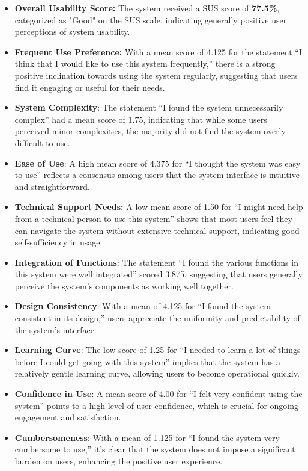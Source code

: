 \documentclass[conference]{IEEEtran}
\begin{document}
    \begin{itemize}
        \item \textbf{Overall Usability Score:} The system received a SUS score of \textbf{77.5\%}, categorized as "Good" on the SUS scale, indicating generally positive user perceptions of system usability.
        \item \textbf{Frequent Use Preference:} With a mean score of 4.125 for the statement ``I think that I would like to use this system frequently,'' there is a strong positive inclination towards using the system regularly, suggesting that users find it engaging or useful for their needs.
        \item \textbf{System Complexity}: The statement ``I found the system unnecessarily complex'' had a mean score of 1.75, indicating that while some users perceived minor complexities, the majority did not find the system overly difficult to use.
        \item \textbf{Ease of Use}: A high mean score of 4.375 for ``I thought the system was easy to use'' reflects a consensus among users that the system interface is intuitive and straightforward.
        \item \textbf{Technical Support Needs:} A low mean score of 1.50 for ``I might need help from a technical person to use this system'' shows that most users feel they can navigate the system without extensive technical support, indicating good self-sufficiency in usage.
        \item \textbf{Integration of Functions}: The statement ``I found the various functions in this system were well integrated'' scored 3.875, suggesting that users generally perceive the system's components as working well together.
        \item \textbf{Design Consistency}: With a mean of 4.125 for ``I found the system consistent in its design,'' users appreciate the uniformity and predictability of the system's interface.
        \item \textbf{Learning Curve}: The low score of 1.25 for ``I needed to learn a lot of things before I could get going with this system'' implies that the system has a relatively gentle learning curve, allowing users to become operational quickly.
        \item \textbf{Confidence in Use}: A mean score of 4.00 for ``I felt very confident using the system'' points to a high level of user confidence, which is crucial for ongoing engagement and satisfaction.
        \item \textbf{Cumbersomeness}: With a mean of 1.125 for ``I found the system very cumbersome to use,'' it's clear that the system does not impose a significant burden on users, enhancing the positive user experience.
    \end{itemize}
    
\end{document}
